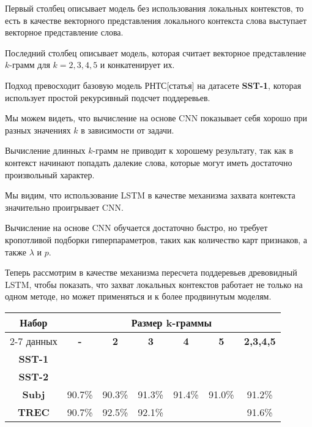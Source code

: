 Первый столбец описывает модель без использования локальных контекстов, то есть в качестве векторного представления локального контекста слова выступает векторное представление слова.

Последний столбец описывает модель, которая считает векторное представление $k$-грамм для $k=2,3,4,5$ и конкатенирует их.

Подход превосходит базовую модель РНТС[статья] на датасете \textbf{SST-1},
которая использует простой рекурсивный подсчет поддеревьев.

Мы можем видеть, что вычисление на основе CNN показывает себя хорошо при разных значениях $k$ в зависимости от задачи.

Вычисление длинных $k$-грамм не приводит к хорошему результату, так как в контекст начинают попадать далекие слова, 
которые могут иметь достаточно произвольный характер.

Мы видим, что использование LSTM в качестве механизма захвата контекста значительно проигрывает CNN.

Вычисление на основе CNN обучается достаточно быстро, но требует кропотливой подборки гиперпараметров, 
таких как количество карт признаков, а также $\lambda$ и $p$.

Теперь рассмотрим в качестве механизма пересчета поддеревьев древовидный LSTM, 
чтобы показать, что захват локальных контекстов работает не только на одном методе, 
но может применяться и к более продвинутым моделям.

\vspace{5mm}
\noindent \begin{minipage}{\linewidth}
 \label{tab:title} 
\begin{tabular}{|c|c|c|c|c|c|c|}
\hline
\multirow{2}{*}{Набор}   &                \multicolumn{6}{c|}{Размер k-граммы} \\ \cline{2-7} 
     данных              & \textbf{-}   &   \textbf{2} & \textbf{3} & \textbf{4} & \textbf{5} & \textbf{2,3,4,5} \\ \hline
\textbf{SST-1}           &              &              &            &            &            & \\ \hline
\textbf{SST-2}           &              &              &            &            &            & \\ \hline
\textbf{Subj}            & 90.7\%       &  90.3\%      & 91.3\%     & 91.4\%     &   91.0\%   &  91.2\% \\ \hline
\textbf{TREC}            & 90.7\%       &  92.5\%      & 92.1\%     &            &            &  91.6\% \\ \hline
\end{tabular}
\end{minipage}
\vspace{5mm}

